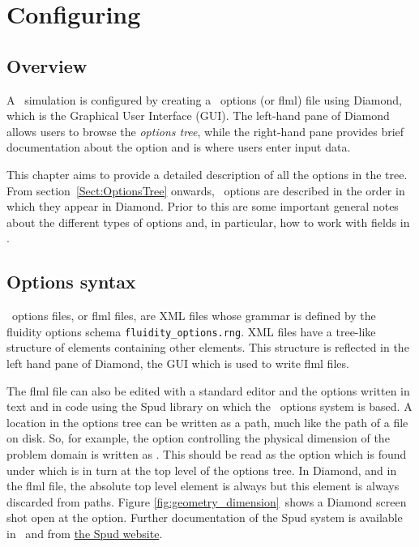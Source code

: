 \chapter{Configuring \fluidity}\label{chap:configuration}

\section{Overview}
A \fluidity\ simulation is configured by creating a \fluidity\ options (or flml) file using
Diamond, which is the Graphical User Interface (GUI). 
The left-hand pane of Diamond allows users to browse the
\emph{options tree}, while the right-hand pane provides brief documentation
about the option and is where users enter input data. 

This chapter aims to provide a detailed description of all the options in
the tree.  From section~\ref{Sect:OptionsTree} onwards, \fluidity\ options are
described in the order in which they appear in Diamond.  Prior to this are
some important general notes about the different types of options and, in
particular, how to work with fields in \fluidity.

\section{Options syntax}
\fluidity\ options files, or flml files, are XML files whose grammar is defined by the
fluidity options schema \verb+fluidity_options.rng+. XML files have a
tree-like structure of elements containing other elements. This structure is
reflected in the left hand pane of Diamond, the GUI which
is used to write flml files.

The flml file can also be edited with a standard editor and the options written
in text and in code using the Spud library on which the \fluidity\ options
system is based. A location in the options tree can be written as a path,
much like the path of a file on disk. So, for example, the option
controlling the physical dimension of the problem domain is written as
. This should be read as the 
option which is found under  which is in turn at the top
level of the options tree. In Diamond, and in the flml file, the absolute
top level element is always  but this element is
always discarded from paths. Figure \ref{fig:geometry_dimension}\ shows a
Diamond screen shot open at the  option. Further
documentation of the Spud system is available in \citet{ham2009}\ and from
\href{http://amcg.ese.ic.ac.uk/spud}{the Spud website}.


